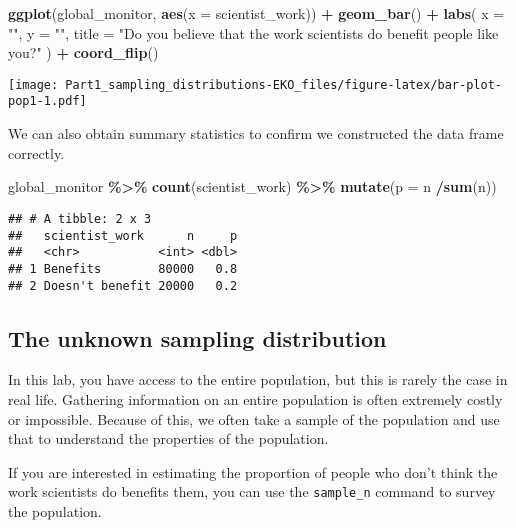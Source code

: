 \documentclass[
]{article}
\newenvironment{Shaded}{\begin{snugshade}}{\end{snugshade}}
\newcommand{\AttributeTok}[1]{\textcolor[rgb]{0.13,0.29,0.53}{#1}}
\newcommand{\FunctionTok}[1]{\textcolor[rgb]{0.13,0.29,0.53}{\textbf{#1}}}
\newcommand{\NormalTok}[1]{#1}
\newcommand{\SpecialCharTok}[1]{\textcolor[rgb]{0.81,0.36,0.00}{\textbf{#1}}}
\newcommand{\StringTok}[1]{\textcolor[rgb]{0.31,0.60,0.02}{#1}}
\begin{document}
\begin{Shaded}
\begin{Highlighting}[]
\FunctionTok{ggplot}\NormalTok{(global\_monitor, }\FunctionTok{aes}\NormalTok{(}\AttributeTok{x =}\NormalTok{ scientist\_work)) }\SpecialCharTok{+}
  \FunctionTok{geom\_bar}\NormalTok{() }\SpecialCharTok{+}
  \FunctionTok{labs}\NormalTok{(}
    \AttributeTok{x =} \StringTok{""}\NormalTok{, }\AttributeTok{y =} \StringTok{""}\NormalTok{,}
    \AttributeTok{title =} \StringTok{"Do you believe that the work scientists do benefit people like you?"}
\NormalTok{  ) }\SpecialCharTok{+}
  \FunctionTok{coord\_flip}\NormalTok{() }
\end{Highlighting}
\end{Shaded}

\texttt{[image: Part1\_sampling\_distributions-EKO\_files/figure-latex/bar-plot-pop1-1.pdf]}

We can also obtain summary statistics to confirm we constructed the data
frame correctly.

\begin{Shaded}
\begin{Highlighting}[]
\NormalTok{global\_monitor }\SpecialCharTok{\%\textgreater{}\%}
  \FunctionTok{count}\NormalTok{(scientist\_work) }\SpecialCharTok{\%\textgreater{}\%}
  \FunctionTok{mutate}\NormalTok{(}\AttributeTok{p =}\NormalTok{ n }\SpecialCharTok{/}\FunctionTok{sum}\NormalTok{(n))}
\end{Highlighting}
\end{Shaded}

\begin{verbatim}
## # A tibble: 2 x 3
##   scientist_work      n     p
##   <chr>           <int> <dbl>
## 1 Benefits        80000   0.8
## 2 Doesn't benefit 20000   0.2
\end{verbatim}

\subsection{The unknown sampling
distribution}\label{the-unknown-sampling-distribution}

In this lab, you have access to the entire population, but this is
rarely the case in real life. Gathering information on an entire
population is often extremely costly or impossible. Because of this, we
often take a sample of the population and use that to understand the
properties of the population.

If you are interested in estimating the proportion of people who don't
think the work scientists do benefits them, you can use the
\texttt{sample\_n} command to survey the population.
\end{document}
